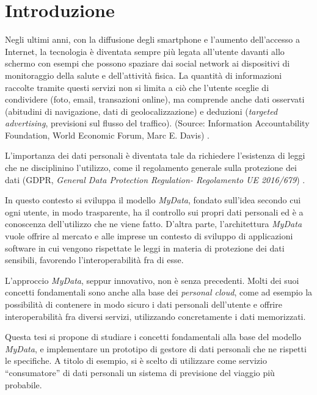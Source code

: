 \chapter{Introduzione}
\label{Introduzione}
\thispagestyle{empty}

\noindent Negli ultimi anni, con la diffusione degli smartphone e l’aumento dell’accesso a Internet, la tecnologia \`e diventata sempre pi\`u legata all’utente davanti allo schermo con esempi che possono spaziare dai social network ai dispositivi di monitoraggio della salute e dell’attivit\`a fisica. La quantit\`a di informazioni raccolte tramite questi servizi non si limita a ci\`o che l’utente sceglie di condividere (foto, email, transazioni online), ma comprende anche dati osservati (abitudini di navigazione, dati di geolocalizzazione) e deduzioni (\textit{targeted advertising}, previsioni sul flusso del traffico). (Source: Information Accountability Foundation, World Economic Forum, Marc E. Davis) \cite{wefreport}.

L’importanza dei dati personali \`e diventata tale da richiedere l’esistenza di leggi che ne disciplinino l’utilizzo, come il regolamento generale sulla protezione dei dati (GDPR, \textit{General Data Protection Regulation- Regolamento UE 2016/679}) \cite{gdpr}.

In questo contesto si sviluppa il modello \textit{MyData}, fondato sull’idea secondo cui ogni utente, in modo trasparente, ha il controllo sui propri dati personali ed \`e a conoscenza dell’utilizzo che ne viene fatto. D’altra parte, l’architettura \textit{MyData} vuole offrire al mercato e alle imprese un contesto di sviluppo di applicazioni software in cui vengono rispettate le leggi in materia di protezione dei dati sensibili, favorendo l’interoperabilit\`a fra di esse.

L’approccio \textit{MyData}, seppur innovativo, non \`e senza precedenti. Molti dei suoi concetti fondamentali sono anche alla base dei \textit{personal cloud}, come ad esempio la possibilit\`a di contenere in modo sicuro i dati personali dell’utente e offrire interoperabilit\`a fra diversi servizi, utilizzando concretamente i dati memorizzati.

Questa tesi si propone di studiare i concetti fondamentali alla base del modello \textit{MyData}, e implementare un prototipo di gestore di dati personali che ne rispetti le specifiche.
A titolo di esempio, si \`e scelto di utilizzare come servizio “consumatore” di dati personali un sistema di previsione del viaggio pi\`u probabile.

